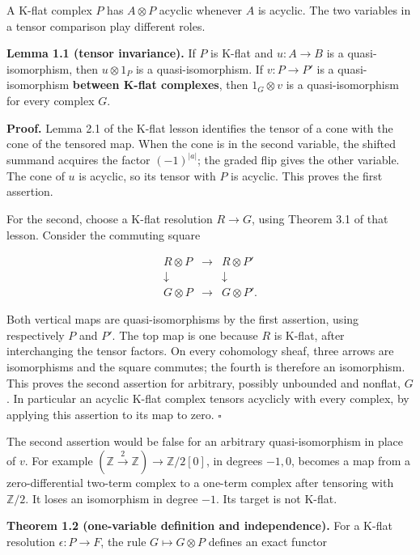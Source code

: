 \documentclass[
  english,
  11pt,
  a4paper,
]{article}
\begin{document}
A K-flat complex \(P\) has \(A\otimes P\) acyclic whenever \(A\) is
acyclic. The two variables in a tensor comparison play different roles.

\textbf{Lemma 1.1 (tensor invariance).} If \(P\) is K-flat and
\(u:A\to B\) is a quasi-isomorphism, then \(u\otimes1_P\) is a
quasi-isomorphism. If \(v:P\to P'\) is a quasi-isomorphism
\textbf{between K-flat complexes}, then \(1_G\otimes v\) is a
quasi-isomorphism for every complex \(G\).

\textbf{Proof.} Lemma 2.1 of the K-flat lesson identifies the tensor of
a cone with the cone of the tensored map. When the cone is in the second
variable, the shifted summand acquires the factor \((-1)^{|a|}\); the
graded flip gives the other variable. The cone of \(u\) is acyclic, so
its tensor with \(P\) is acyclic. This proves the first assertion.

For the second, choose a K-flat resolution \(R\to G\), using Theorem 3.1
of that lesson. Consider the commuting square

\[\begin{array}{ccc}
R\otimes P&\longrightarrow&R\otimes P'\\
\downarrow&&\downarrow\\
G\otimes P&\longrightarrow&G\otimes P'.
\end{array}
\tag{1.1}\]

Both vertical maps are quasi-isomorphisms by the first assertion, using
respectively \(P\) and \(P'\). The top map is one because \(R\) is
K-flat, after interchanging the tensor factors. On every cohomology
sheaf, three arrows are isomorphisms and the square commutes; the fourth
is therefore an isomorphism. This proves the second assertion for
arbitrary, possibly unbounded and nonflat, \(G\). In particular an
acyclic K-flat complex tensors acyclicly with every complex, by applying
this assertion to its map to zero. \(\square\)

The second assertion would be false for an arbitrary quasi-isomorphism
in place of \(v\). For example
\((\mathbb Z\xrightarrow{2}\mathbb Z)\to\mathbb Z/2[0]\), in degrees
\(-1,0\), becomes a map from a zero-differential two-term complex to a
one-term complex after tensoring with \(\mathbb Z/2\). It loses an
isomorphism in degree \(-1\). Its target is not K-flat.

\textbf{Theorem 1.2 (one-variable definition and independence).} For a
K-flat resolution \(\epsilon:P\to F\), the rule \(G\mapsto G\otimes P\)
defines an exact functor
\end{document}
